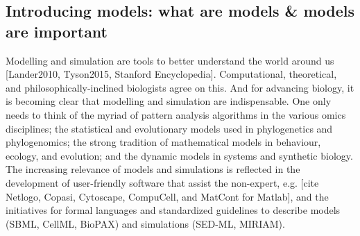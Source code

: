 \subsection{Introducing models: what are models \& models are important}

Modelling and simulation are tools to better understand the world around us [Lander2010, Tyson2015, Stanford Encyclopedia]. Computational, theoretical, and philosophically-inclined biologists agree on this. And for advancing biology, it is becoming clear that modelling and simulation are indispensable. One only needs to think of the myriad of pattern analysis algorithms in the various omics disciplines; the statistical and evolutionary models used in phylogenetics and phylogenomics; the strong tradition of mathematical models in behaviour, ecology, and evolution; and the dynamic models in systems and synthetic biology. The increasing relevance of models and simulations is reflected in the development of user-friendly software that assist the non-expert, e.g. [cite Netlogo, Copasi, Cytoscape, CompuCell, and MatCont for Matlab], and the initiatives for formal languages and standardized guidelines to describe models (SBML, CellML, BioPAX) and simulations (SED-ML, MIRIAM).

  